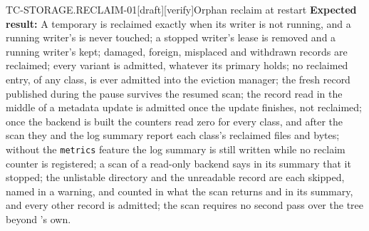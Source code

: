 \begin{requirement}{TC-STORAGE.RECLAIM-01}[draft][verify]{Orphan reclaim at restart}
  \textbf{Expected result:} A temporary is reclaimed exactly when its writer
  is not running, and a running writer's is never touched; a stopped
  writer's lease is removed and a running writer's kept; damaged, foreign,
  misplaced and withdrawn records are reclaimed; every variant is admitted, whatever
  its primary holds; no reclaimed entry, of any class, is ever admitted into the
  eviction manager; the fresh record published during the pause survives the
  resumed scan; the record read in the middle of a metadata update is
  admitted once the update finishes, not reclaimed; once the backend is
  built the counters read zero for every class, and after the scan they and
  the log summary report each class's reclaimed files and bytes; without
  the \texttt{metrics} feature the log summary is still written while no
  reclaim counter is registered; a scan
  of a read-only backend says in its summary that it stopped; the
  unlistable directory and the unreadable record are each skipped, named in
  a warning, and counted in what the scan returns and in its summary, and
  every other record is admitted;
  the scan requires no second pass over the tree beyond
  's own.



\end{requirement}

